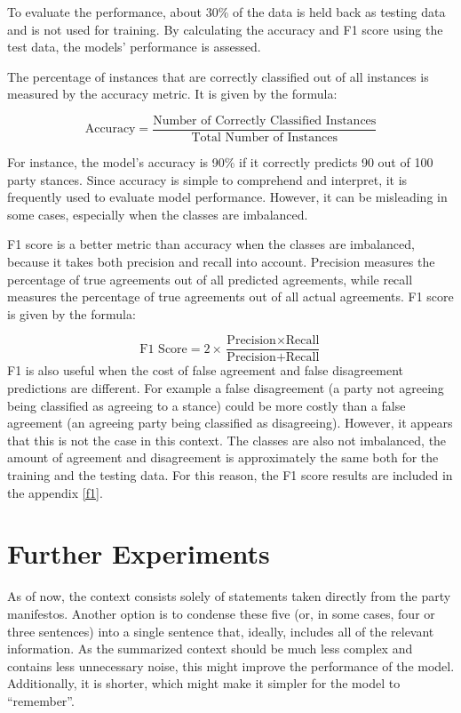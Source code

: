 To evaluate the performance, about 30\% of the data is held back as testing data and is not used for training. By calculating the accuracy and F1 score using the test data, the models' performance is assessed. 

The percentage of instances that are correctly classified out of all instances is measured by the accuracy metric. It is given by the formula:

\begin{equation}
\text{Accuracy} = \frac{\text{Number of Correctly Classified Instances}}{\text{Total Number of Instances}}
\end{equation}

For instance, the model's accuracy is 90\% if it correctly predicts 90 out of 100 party stances. Since accuracy is simple to comprehend and interpret, it is frequently used to evaluate model performance. However, it can be misleading in some cases, especially when the classes are imbalanced.

F1 score is a better metric than accuracy when the classes are imbalanced, because it takes both precision and recall into account. Precision measures the percentage of true agreements out of all predicted agreements, while recall measures the percentage of true agreements out of all actual agreements. F1 score is given by the formula:

\begin{equation}
\text{F1 Score} = 2 \times \frac{\text{Precision} \times \text{Recall}}{\text{Precision} + \text{Recall}}
\end{equation}
F1 is also useful when the cost of false agreement and false disagreement predictions are different. For example a false disagreement (a party not agreeing being classified as agreeing to a stance) could be more costly than a false agreement (an agreeing party being classified as disagreeing). However, it appears that this is not the case in this context. The classes are also not imbalanced, the amount of agreement and disagreement is approximately the same both for the training and the testing data. For this reason, the F1 score results are included in the appendix \ref{f1}.

\section{Further Experiments} \label{exp_further}

As of now, the context consists solely of statements taken directly from the party manifestos. Another option is to condense these five (or, in some cases, four or three sentences) into a single sentence that, ideally, includes all of the relevant information. As the summarized context should be much less complex and contains less unnecessary noise, this might improve the performance of the model. Additionally, it is shorter, which might make it simpler for the model to ``remember''.

